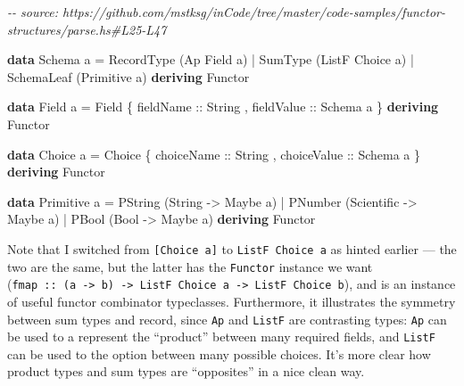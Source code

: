 \documentclass[]{article}
\newenvironment{Shaded}{}{}
\newcommand{\CommentTok}[1]{\textcolor[rgb]{0.38,0.63,0.69}{\textit{#1}}}
\newcommand{\DataTypeTok}[1]{\textcolor[rgb]{0.56,0.13,0.00}{#1}}
\newcommand{\KeywordTok}[1]{\textcolor[rgb]{0.00,0.44,0.13}{\textbf{#1}}}
\newcommand{\NormalTok}[1]{#1}
\newcommand{\OperatorTok}[1]{\textcolor[rgb]{0.40,0.40,0.40}{#1}}
\newcommand{\OtherTok}[1]{\textcolor[rgb]{0.00,0.44,0.13}{#1}}
\begin{document}
\begin{Shaded}
\begin{Highlighting}[]
\CommentTok{{-}{-} source: https://github.com/mstksg/inCode/tree/master/code{-}samples/functor{-}structures/parse.hs\#L25{-}L47}

\KeywordTok{data} \DataTypeTok{Schema}\NormalTok{ a }\OtherTok{=}
      \DataTypeTok{RecordType}\NormalTok{  (}\DataTypeTok{Ap}    \DataTypeTok{Field}\NormalTok{  a)}
    \OperatorTok{|} \DataTypeTok{SumType}\NormalTok{     (}\DataTypeTok{ListF} \DataTypeTok{Choice}\NormalTok{ a)}
    \OperatorTok{|} \DataTypeTok{SchemaLeaf}\NormalTok{  (}\DataTypeTok{Primitive}\NormalTok{ a)}
  \KeywordTok{deriving} \DataTypeTok{Functor}

\KeywordTok{data} \DataTypeTok{Field}\NormalTok{ a }\OtherTok{=} \DataTypeTok{Field}
\NormalTok{    \{}\OtherTok{ fieldName  ::} \DataTypeTok{String}
\NormalTok{    ,}\OtherTok{ fieldValue ::} \DataTypeTok{Schema}\NormalTok{ a}
\NormalTok{    \}}
  \KeywordTok{deriving} \DataTypeTok{Functor}

\KeywordTok{data} \DataTypeTok{Choice}\NormalTok{ a }\OtherTok{=} \DataTypeTok{Choice}
\NormalTok{    \{}\OtherTok{ choiceName  ::} \DataTypeTok{String}
\NormalTok{    ,}\OtherTok{ choiceValue ::} \DataTypeTok{Schema}\NormalTok{ a}
\NormalTok{    \}}
  \KeywordTok{deriving} \DataTypeTok{Functor}

\KeywordTok{data} \DataTypeTok{Primitive}\NormalTok{ a }\OtherTok{=}
      \DataTypeTok{PString}\NormalTok{ (}\DataTypeTok{String}     \OtherTok{{-}\textgreater{}} \DataTypeTok{Maybe}\NormalTok{ a)}
    \OperatorTok{|} \DataTypeTok{PNumber}\NormalTok{ (}\DataTypeTok{Scientific} \OtherTok{{-}\textgreater{}} \DataTypeTok{Maybe}\NormalTok{ a)}
    \OperatorTok{|} \DataTypeTok{PBool}\NormalTok{   (}\DataTypeTok{Bool}       \OtherTok{{-}\textgreater{}} \DataTypeTok{Maybe}\NormalTok{ a)}
  \KeywordTok{deriving} \DataTypeTok{Functor}
\end{Highlighting}
\end{Shaded}

Note that I switched from \texttt{{[}Choice\ a{]}} to \texttt{ListF\ Choice\ a}
as hinted earlier --- the two are the same, but the latter has the
\texttt{Functor} instance we want
(\texttt{fmap\ ::\ (a\ -\textgreater{}\ b)\ -\textgreater{}\ ListF\ Choice\ a\ -\textgreater{}\ ListF\ Choice\ b}),
and is an instance of useful functor combinator typeclasses. Furthermore, it
illustrates the symmetry between sum types and record, since \texttt{Ap} and
\texttt{ListF} are contrasting types: \texttt{Ap} can be used to a represent the
``product'' between many required fields, and \texttt{ListF} can be used to the
option between many possible choices. It's more clear how product types and sum
types are ``opposites'' in a nice clean way.
\end{document}
